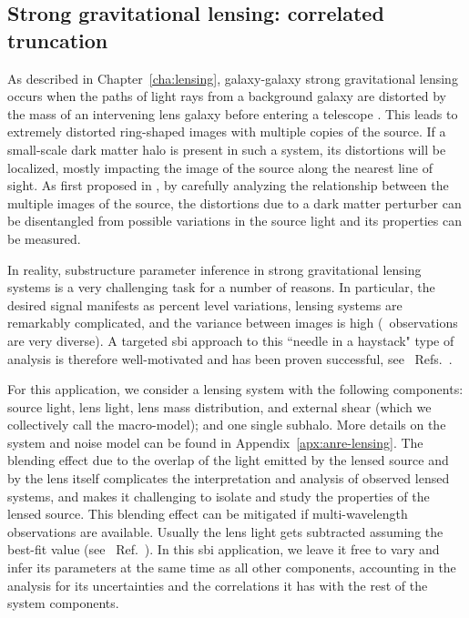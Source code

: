 \subsection{Strong gravitational lensing: correlated truncation} \label{subsec:lensing}

 As described in Chapter~\ref{cha:lensing}, galaxy-galaxy strong gravitational lensing occurs when the paths of light rays from a background galaxy are distorted by the mass of an intervening lens galaxy before entering a telescope \cite{Meneghetti:2016aa}. This leads to extremely distorted ring-shaped images with multiple copies of the source. If a small-scale dark matter halo is present in such a system, its distortions will be localized, mostly impacting the image of the source along the nearest line of sight. As first proposed in \cite{Mao:1997ek}, by carefully analyzing the relationship between the multiple images of the source, the distortions due to a dark matter perturber can be disentangled from possible variations in the source light and its properties can be measured.

In reality, substructure parameter inference in strong gravitational lensing systems is a very challenging task for a number of reasons. In particular, the desired signal manifests as percent level variations, lensing systems are remarkably complicated, and the variance between images is high (\ie~observations are very diverse). A targeted \gls*{sbi} approach to this ``needle in a haystack" type of analysis is therefore well-motivated and has been proven successful, see \eg~Refs.~\cite{Coogan:2020yux, Coogan:2022cky}. 

For this application, we consider a lensing system with the following components: source light, lens light, lens mass distribution, and external shear (which we collectively call the macro-model); and one single subhalo. More details on the system and noise model can be found in Appendix~\ref{apx:anre-lensing}. The blending effect due to the overlap of the light emitted by the lensed source and by the lens itself complicates the interpretation and analysis of observed lensed systems, and makes it challenging to isolate and study the properties of the lensed source. This blending effect can be mitigated if multi-wavelength observations are available. Usually the lens light gets subtracted assuming the best-fit value (see \eg~Ref.~\cite{Vegetti:2012mc}). In this \gls*{sbi} application, we leave it free to vary and infer its parameters at the same time as all other components, accounting in the analysis for its uncertainties and the correlations it has with the rest of the system components.

